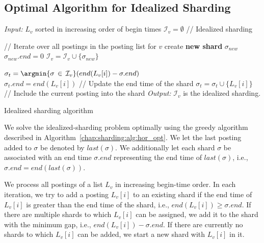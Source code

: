 \subsection{Optimal Algorithm for Idealized Sharding}
\label{susec:idealized_algo}

 \begin{algorithm}[htb]
   \small
   \begin{algorithmic}[1]
     \STATE  \emph{Input:} $L_v$ sorted in increasing order of begin times
    \STATE $\mathcal{I}_v = \emptyset$ \quad // Idealized sharding
 	
 	\STATE {} 
	\STATE // Iterate over all postings in the posting list for $v$
        		\STATE create \textbf{new shard} $\sigma_{new}$ \\
			\STATE $\sigma_{new}.end = 0$
                        \STATE $\mathcal{I}_v = \mathcal{I}_v \cup \{\sigma_{new}\}$
        \ENDIF

\STATE $\sigma_{t} =\argmin{\sigma\, \in \,\mathcal{I}_v} (end(L_v[i]) - \sigma.end)$ \\
        
\STATE $\sigma_{t}.end = end(L_v[i])$ // Update the end time of the shard
		\STATE $\sigma_{t} = \sigma_{t}  \cup \{L_v [i]\}$	// Include the current posting into the shard
\STATE
   	\ENDFOR
\STATE
\STATE\emph{Output:} $\mathcal{I}_v$  is the idealized sharding.

   \end{algorithmic}
   \caption{Idealized sharding algorithm}
   \label{chap:sharding:alg:hor_opt}
 \end{algorithm}

We solve the idealized-sharding problem optimally using the greedy  
algorithm described in Algorithm~\ref{chap:sharding:alg:hor_opt}. We let the last posting added to $\sigma$ be denoted by $last(\sigma)$. We additionally let each shard $\sigma$ be associated with an end time $\sigma.end$ representing the end time of $last(\sigma)$, i.e., $\sigma.end = end(last(\sigma))$.

We process all postings of a list $L_{v}$ in increasing begin-time order. In each iteration, we try to add a posting $L_{v}[i]$ to an existing shard if the end time of $L_{v}[i]$ is greater than the end time of the shard, i.e., $end(L_{v}[i]) \geq \sigma.end$. If there are multiple shards to which $L_{v}[i]$ can be assigned, we
 add it to the shard with the minimum gap, i.e., $end(L_{v}[i]) - \sigma.end$. If there are currently no shards to which $L_{v}[i]$ can be added, we start a new shard with $L_{v}[i]$ in it. 

